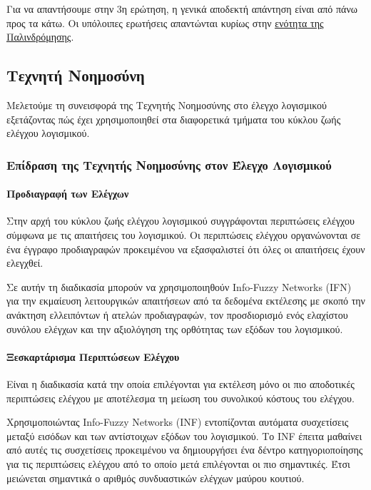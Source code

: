 \documentclass[12pt]{article}
\newcommand{\linkstyle}[1]{\color{blue}\underline{#1}}
\begin{document}
\par Για να απαντήσουμε στην 3η ερώτηση, η γενικά αποδεκτή απάντηση είναι από πάνω προς τα κάτω. Οι υπόλοιπες ερωτήσεις απαντώνται κυρίως στην\newline
\hyperref[sec:Regression]{\linkstyle{ενότητα της Παλινδρόμησης}}.

\subsection{Τεχνητή Νοημοσύνη}

\par Μελετούμε τη συνεισφορά της Τεχνητής Νοημοσύνης στο έλεγχο λογισμικού εξετάζοντας πώς έχει χρησιμοποιηθεί στα διαφορετικά τμήματα του κύκλου ζωής ελέγχου λογισμικού.

\subsubsection{Επίδραση της Τεχνητής Νοημοσύνης στον Έλεγχο Λογισμικού} 

\paragraph{Προδιαγραφή των Ελέγχων \cite{zubair}}
Στην αρχή του κύκλου ζωής ελέγχου λογισμικού συγγράφονται περιπτώσεις ελέγχου σύμφωνα με τις απαιτήσεις του λογισμικού. Οι περιπτώσεις ελέγχου οργανώνονται σε ένα έγγραφο προδιαγραφών προκειμένου να εξασφαλιστεί ότι όλες οι απαιτήσεις έχουν ελεγχθεί.
\par Σε αυτήν τη διαδικασία μπορούν να χρησιμοποιηθούν Info-Fuzzy Networks (IFN) για την εκμαίευση λειτουργικών απαιτήσεων από τα δεδομένα εκτέλεσης με σκοπό την ανάκτηση ελλειπόντων ή ατελών προδιαγραφών, τον προσδιορισμό ενός ελαχίστου συνόλου ελέγχων και την αξιολόγηση της ορθότητας των εξόδων του λογισμικού.

\paragraph{Ξεσκαρτάρισμα Περιπτώσεων Ελέγχου}
Είναι η διαδικασία κατά την οποία επιλέγονται για εκτέλεση μόνο οι πιο αποδοτικές περιπτώσεις ελέγχου με αποτέλεσμα τη μείωση του συνολικού κόστους του ελέγχου.
\par Χρησιμοποιώντας Info-Fuzzy Networks (INF) εντοπίζονται αυτόματα συσχετίσεις μεταξύ εισόδων και των αντίστοιχων εξόδων του λογισμικού. Το INF έπειτα μαθαίνει από αυτές τις συσχετίσεις προκειμένου να δημιουργήσει ένα δέντρο κατηγοριοποίησης για τις περιπτώσεις ελέγχου από το οποίο μετά επιλέγονται οι πιο σημαντικές. Έτσι μειώνεται σημαντικά ο αριθμός συνδυαστικών ελέγχων μαύρου κουτιού.
\end{document}
